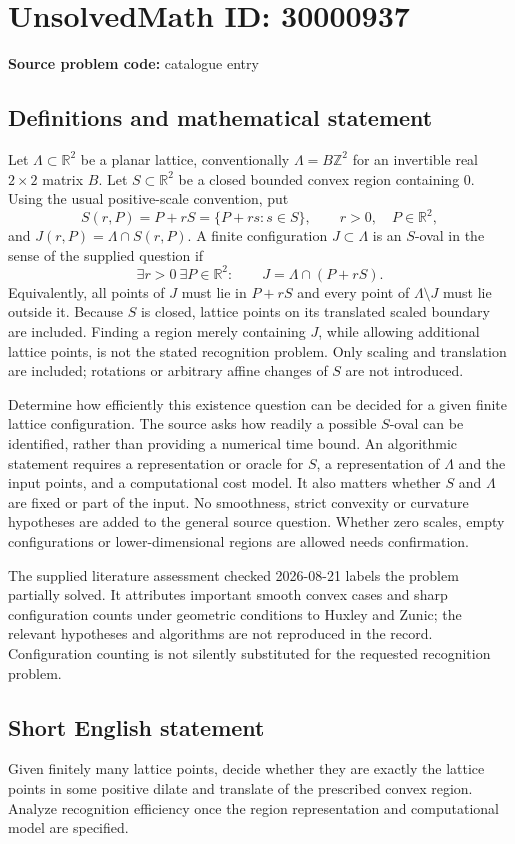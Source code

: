 \documentclass[11pt]{article}
\newcommand{\Z}{\mathbb{Z}}
\newcommand{\R}{\mathbb{R}}
\begin{document}
\section*{UnsolvedMath ID: 30000937}
\textbf{Source problem code:} catalogue entry
\subsection{Definitions and mathematical statement}
Let $\Lambda\subset\R^2$ be a planar lattice, conventionally $\Lambda=B\Z^2$ for an invertible real $2\times2$ matrix $B$. Let $S\subset\R^2$ be a closed bounded convex region containing $0$. Using the usual positive-scale convention, put
\[
S(r,P)=P+rS=\{P+rs:s\in S\},\qquad r>0,\quad P\in\R^2,
\]
and $J(r,P)=\Lambda\cap S(r,P)$. A finite configuration $J\subset\Lambda$ is an $S$-oval in the sense of the supplied question if
\[
\exists r>0\ \exists P\in\R^2:\qquad J=\Lambda\cap(P+rS).
\]
Equivalently, all points of $J$ must lie in $P+rS$ and every point of $\Lambda\setminus J$ must lie outside it. Because $S$ is closed, lattice points on its translated scaled boundary are included. Finding a region merely containing $J$, while allowing additional lattice points, is not the stated recognition problem. Only scaling and translation are included; rotations or arbitrary affine changes of $S$ are not introduced.

Determine how efficiently this existence question can be decided for a given finite lattice configuration. The source asks how readily a possible $S$-oval can be identified, rather than providing a numerical time bound. An algorithmic statement requires a representation or oracle for $S$, a representation of $\Lambda$ and the input points, and a computational cost model. It also matters whether $S$ and $\Lambda$ are fixed or part of the input. No smoothness, strict convexity or curvature hypotheses are added to the general source question. Whether zero scales, empty configurations or lower-dimensional regions are allowed needs confirmation.

The supplied literature assessment checked 2026-08-21 labels the problem partially solved. It attributes important smooth convex cases and sharp configuration counts under geometric conditions to Huxley and Zunic; the relevant hypotheses and algorithms are not reproduced in the record. Configuration counting is not silently substituted for the requested recognition problem.
\subsection{Short English statement}
Given finitely many lattice points, decide whether they are exactly the lattice points in some positive dilate and translate of the prescribed convex region. Analyze recognition efficiency once the region representation and computational model are specified.
\end{document}
